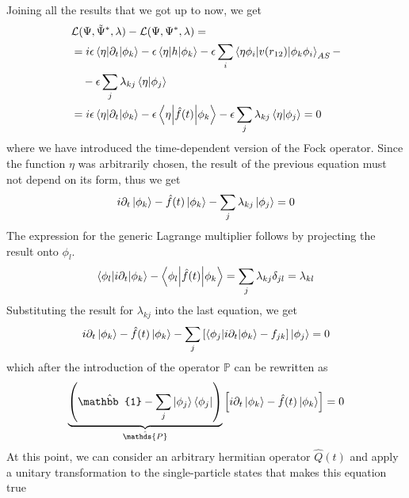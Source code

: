 Joining all the results that we got up to now, we get
\begin{align*}
    &\mathcal{L}(\Psi, \Tilde{\Psi}^*, \lambda) -  \mathcal{L}(\Psi, \Psi^*, \lambda) = \\
    & = i\epsilon \bracketOP{\eta}{\phi_k}{\partial_t} - \epsilon \bracketOP{\eta}{\phi_k}{h} - \epsilon \sum_{i} \bracketOP{\eta \phi_i}{\phi_k \phi_i }{v(r_{12})}_{AS} - \\
    & \quad- \epsilon \sum_j \lambda_{kj} \bracket{\eta}{\phi_j} \\
    &= i\epsilon \bracketOP{\eta}{\phi_k}{\partial_t} - \epsilon \bracketOP{\eta}{\phi_k}{\hat{f}(t)} - \epsilon \sum_j \lambda_{kj} \bracket{\eta}{\phi_j} = 0
\end{align*}
where we have introduced the time-dependent version of the Fock operator. Since the function $\eta$ was arbitrarily chosen, the result of the previous equation must not depend on its form, thus we get
\begin{align*}
    i \partial_t \ket{\phi_k} - \hat{f}(t) \ket{\phi_k} - \sum_j \lambda_{kj} \ket{\phi_j} = 0
\end{align*}
The expression for the generic Lagrange multiplier follows by projecting the result onto $\phi_l$.
\begin{align*}
    \bracketOP{\phi_l}{\phi_k}{i\partial_t} - \bracketOP{\phi_l}{\phi_k}{\hat{f}(t)} = \sum_j \lambda_{kj} \delta_{jl} = \lambda_{kl}
\end{align*}
Substituting the result for $\lambda_{kj}$ into the last equation, we get
\begin{gather*}
    i \partial_t \ket{\phi_k} - \hat{f}(t) \ket{\phi_k} - \sum_j \left[ \bracketOP{\phi_j}{\phi_k}{i\partial_t} - f_{jk} \right] \ket{\phi_j} = 0
\end{gather*}
which after the introduction of the operator $\mathds{P}$ can be rewritten as
\begin{align}
    \underbrace{ \left( \hat{\mathbb{1}} - \sum_j \ket{\phi_j} \bra{\phi_j} \right)}_{\hat{\mathds{P}}}  \left[ i\partial_t \ket{\phi_k} - \hat{f}(t) \ket{\phi_k} \right] = 0
    \label{eq:intermed_step_t_dep_HF}
\end{align}
At this point, we can consider an arbitrary hermitian operator $\hat{Q}(t)$ and apply a unitary transformation to the single-particle states that makes this equation true
